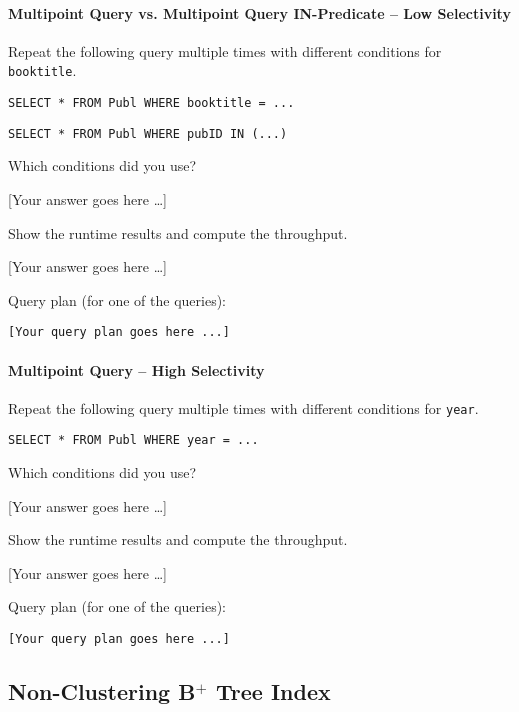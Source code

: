 \documentclass[11pt]{scrartcl}
\newcommand{\youranswerhere}{[Your answer goes here \ldots]}
\begin{document}
\paragraph{Multipoint Query vs. Multipoint Query IN-Predicate -- Low Selectivity}

Repeat the following query multiple times with different conditions for \texttt{booktitle}.

\begin{lstlisting}[style=dbtsql]
SELECT * FROM Publ WHERE booktitle = ...
\end{lstlisting}

\begin{lstlisting}[style=dbtsql]
SELECT * FROM Publ WHERE pubID IN (...)
\end{lstlisting}


Which conditions did you use?

\youranswerhere{}

Show the runtime results and compute the throughput.

\youranswerhere{}

Query plan (for one of the queries):

{\small
\parskip0pt\begin{verbatim}
[Your query plan goes here ...]
\end{verbatim}}

\paragraph{Multipoint Query -- High Selectivity}

Repeat the following query multiple times with different conditions for \texttt{year}.

\begin{lstlisting}[style=dbtsql]
SELECT * FROM Publ WHERE year = ...
\end{lstlisting}

Which conditions did you use?

\youranswerhere{}

Show the runtime results and compute the throughput.

\youranswerhere{}

Query plan (for one of the queries):

{\small
\parskip0pt\begin{verbatim}
[Your query plan goes here ...]
\end{verbatim}}

\subsection*{Non-Clustering B$^+$ Tree Index}
\end{document}

